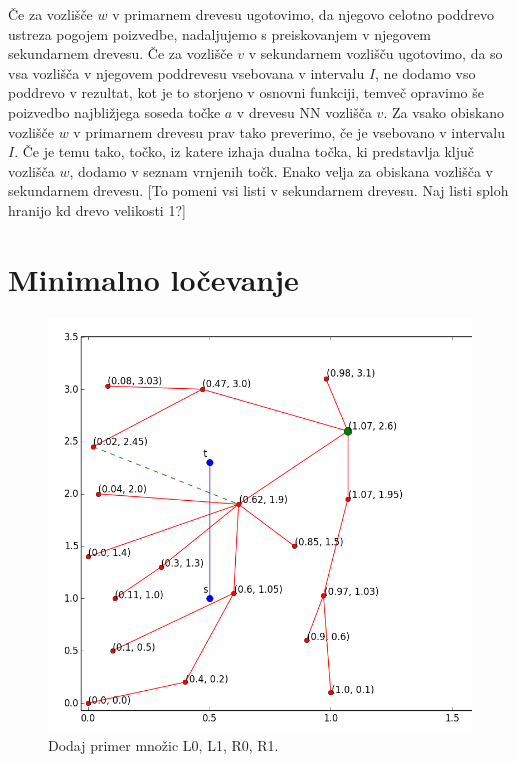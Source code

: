 \documentclass[a4paper, 12pt]{book}
\begin{document}
Če za vozlišče $w$ v primarnem drevesu ugotovimo, da njegovo celotno poddrevo ustreza pogojem poizvedbe, nadaljujemo s preiskovanjem v njegovem sekundarnem drevesu. Če za vozlišče $v$ v sekundarnem vozlišču ugotovimo, da so vsa vozlišča v njegovem poddrevesu vsebovana v intervalu $I$, ne dodamo vso poddrevo v rezultat, kot je to storjeno v osnovni funkciji, temveč opravimo še poizvedbo najbližjega soseda točke $a$ v drevesu NN vozlišča $v$. Za vsako obiskano vozlišče $w$ v primarnem drevesu prav tako preverimo, če je vsebovano v intervalu $I$. Če je temu tako, točko, iz katere izhaja dualna točka, ki predstavlja ključ vozlišča $w$, dodamo v seznam vrnjenih točk. Enako velja za obiskana vozlišča v sekundarnem drevesu. [To pomeni vsi listi v sekundarnem drevesu. Naj listi sploh hranijo kd drevo velikosti 1?] 






\section{Minimalno ločevanje}

\begin{figure}
\centerline{\includegraphics[scale=0.7]{pics/primer1.png}}
\caption{Dodaj primer množic L0, L1, R0, R1. }
\label{primer-sep}
\end{figure}
\end{document}
